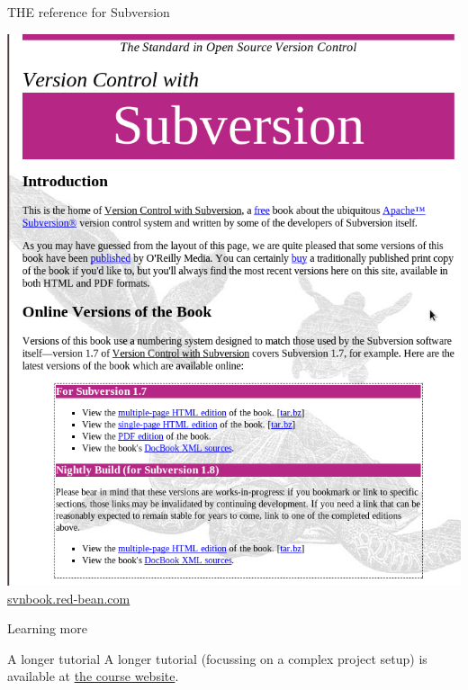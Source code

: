 \documentclass[xcolor=table,compress]{beamer}
\begin{document}
\begin{frame}{THE reference for Subversion}
\begin{center}
\includegraphics[height=0.7\textheight]{./svn-book}\newline\Large
\href{http://svnbook.red-bean.com/}{svnbook.red-bean.com}
\end{center}
\end{frame}


\begin{frame}{Learning more}
\begin{block}{A longer tutorial}
A longer tutorial (focussing on a complex project setup) is available at \href{http://www.vrdc.cornell.edu/computing-for-economists/web/COMPUTER_Subversion_LongTutorial.pdf}{the course website}.
\end{block}
\end{frame}
\end{document}
